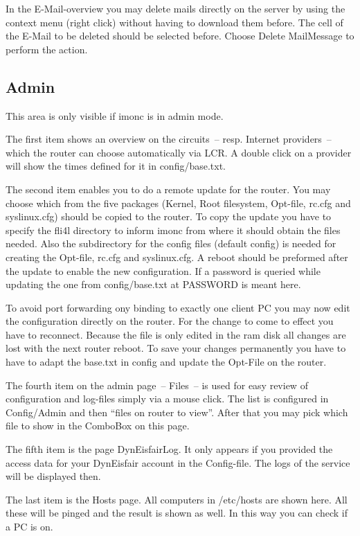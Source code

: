   In the \mbox{E-Mail}-overview you may delete mails directly on the server
  by using the context menu (right click) without having to download them before.
  The cell of the  \mbox{E-Mail} to be deleted should be selected before.
  Choose Delete MailMessage to perform the action.


  \subsection{Admin}

  This area is only visible if imonc is in admin mode.

  The first item shows an overview on the circuits~-- resp. Internet providers~--
  which the router can choose automatically via LCR. A double click on a provider
  will show the times defined for it in config/base.txt.

  The second item enables you to do a remote update for the router. You may choose
  which from the five packages (Kernel, Root filesystem, Opt-file, rc.cfg
  and syslinux.cfg) should be copied to the router. To copy the update you have
  to specify the fli4l directory to inform imonc from where it should obtain the
  files needed. Also the subdirectory for the config files (default config) is needed
  for creating the Opt-file, rc.cfg and syslinux.cfg. A reboot should be preformed
  after the update to enable the new configuration. If a password is queried while
  updating the one from config/base.txt at PASSWORD is meant here.

  To avoid port forwarding ony binding to exactly one client PC you may now edit
  the configuration directly on the router. For the change to come to effect
  you have to reconnect. Because the file is only edited in the ram disk all changes
  are lost with the next router reboot. To save your changes permanently
  you have to have to adapt the base.txt in config and update the Opt-File on the router.

  The fourth item on the admin page~-- Files~-- is used for easy review
  of configuration and log-files simply via a mouse click.
  The list is configured in Config/Admin and then ``files on router to view''.
  After that you may pick which file to show in the ComboBox on this page.

  The fifth item is the page DynEisfairLog. It only appears if you provided the
  access data for your DynEisfair account in the Config-file. The logs of the
  service will be displayed then.

  The last item is the Hosts page. All computers in /etc/hosts are shown here.
  All these will be pinged and the result is shown as well. In this way you
  can check if a PC is on. 

